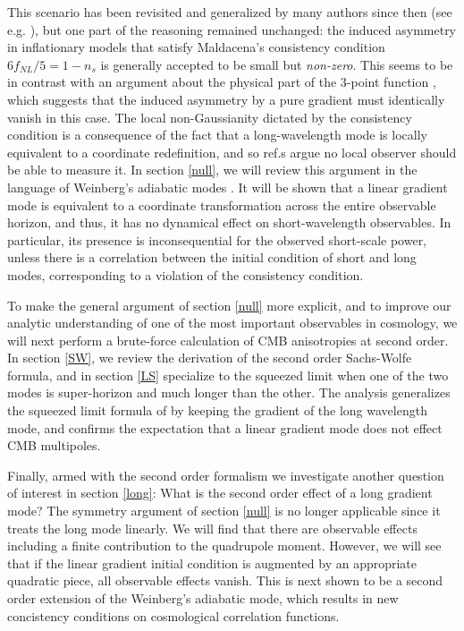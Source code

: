\documentclass[12pt]{article}
\numberwithin{equation}{section}
\begin{document}
This scenario has been revisited and generalized by many authors since then (see e.g. \cite{Lyth}), but one part of the reasoning remained unchanged: the induced asymmetry in inflationary models that satisfy Maldacena's consistency condition $6f_{NL}/5=1-n_s$ is generally accepted to be small but {\em non-zero}. This seems to be in contrast with an argument about the physical part of the 3-point function \cite{Tanaka,Pajer}, which suggests that the induced asymmetry by a pure gradient must identically vanish in this case. The local non-Gaussianity dictated by the consistency condition is a consequence of the fact that a long-wavelength mode is locally equivalent to a coordinate redefinition, and so ref.s \cite{Tanaka,Pajer} argue no local observer should be able to measure it. In section \ref{null}, we will review this argument in the language of Weinberg's adiabatic modes \cite{Weinberg}. It will be shown that a linear gradient mode is equivalent to a coordinate transformation across the entire observable horizon, and thus, it has no dynamical effect on short-wavelength observables. In particular, its presence is inconsequential for the observed short-scale power, unless there is a correlation between the initial condition of short and long modes, corresponding to a violation of the consistency condition.

To make the general argument of section \ref{null} more explicit, and to improve our analytic understanding of one of the most important observables in cosmology, we will next perform a brute-force calculation of CMB anisotropies at second order. In section \ref{SW}, we review the derivation of the second order Sachs-Wolfe formula, and in section \ref{LS} specialize to the squeezed limit when one of the two modes is super-horizon and much longer than the other. The analysis generalizes the squeezed limit formula of \cite{Creminelli_squeezed} by keeping the gradient of the long wavelength mode, and confirms the expectation that a linear gradient mode does not effect CMB multipoles.

Finally, armed with the second order formalism we investigate another question of interest in section \ref{long}: What is the second order effect of a long gradient mode? The symmetry argument of section \ref{null} is no longer applicable since it treats the long mode linearly. We will find that there are observable effects including a finite contribution to the quadrupole moment. However, we will see that if the linear gradient initial condition is augmented by an appropriate quadratic piece, all observable effects vanish. This is next shown to be a second order extension of the Weinberg's adiabatic mode, which results in new concistency conditions on cosmological correlation functions.
\end{document}
